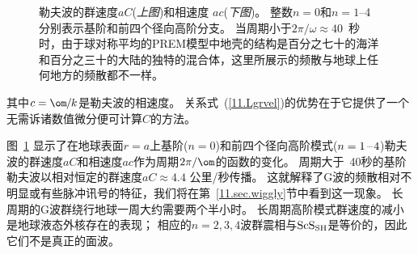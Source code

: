 \begin{figure}[!b]
\begin{center}
\end{center}
\caption[Love speeds]{
\label{fig:11.5}
勒夫波的群速度$aC$({\em 上图\/})和相速度 $ac$({\em 下图\/})。
整数$n=0$和$n=1$--4分别表示基阶和前四个径向高阶分支。
当周期小于$2\pi/\omega\approx 40$~秒时，由于球对称平均的PREM模型中地壳的结构是百分之七十的海洋和百分之三十的大陆的独特的混合体，这里所展示的频散与地球上任何地方的频散都不一样。}
\end{figure}
其中$c=\om\hspace{-0.2 mm}/\hspace{-0.2 mm}k$是勒夫波的相速度。
关系式~(\ref{11.Lgrvel})的优势在于它提供了一个无需诉诸数值微分便可计算$C$的方法。

图~\ref{fig:11.5} 显示了在地球表面$r=a$上基阶($n=0$)和前四个径向高阶模式($n=1\hspace{0.2 mm}$--$\hspace{0.2 mm}4$)勒夫波的群速度$aC$和相速度$ac$作为周期$2\pi/\om$的函数的变化。
周期大于~40秒的基阶勒夫波以相对恒定的群速度$aC\approx 4.4$ 公里/秒传播。
这就解释了G波的频散相对不明显或有些脉冲讯号的特征，我们将在第~\ref{11.sec.wiggly}节中看到这一现象。
长周期的G波群绕行地球一周大约需要两个半小时。
长周期高阶模式群速度的减小是地球液态外核存在的表现；
相应的$n=2,3,4$波群震相与${\rm ScS}_{\rm SH}$是等价的，因此它们不是真正的面波。
%
%

